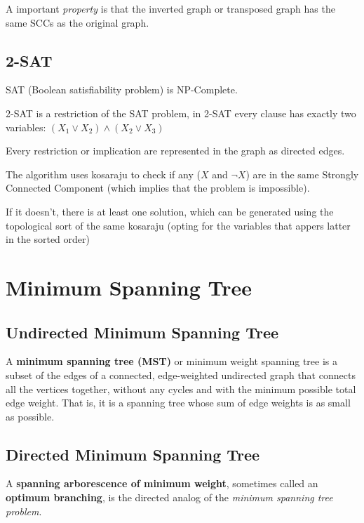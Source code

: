 	A important \textit{property} is that the inverted graph or transposed graph has the same SCCs
	as the original graph.


	\subsection{2-SAT}
	
		SAT (Boolean satisfiability problem) is NP-Complete.

		2-SAT is a restriction of the SAT problem, in 2-SAT every clause has exactly two variables:
		$ (X_1 \vee X_2) \wedge (X_2 \vee X_3) $

		Every restriction or implication are represented in the graph as directed edges.

		The algorithm uses kosaraju to check if any ($X$ and $\neg{X}$) are in the same Strongly Connected Component 
		(which implies that the problem is impossible). 

		If it doesn't, there is at least one solution, which can be generated using the topological sort of the same kosaraju 
		(opting for the variables that appers latter in the sorted order)


\section{Minimum Spanning Tree}

\subsection{Undirected Minimum Spanning Tree}

	A \textbf{minimum spanning tree (MST)} or minimum weight spanning tree is a subset of the edges
	of a connected, edge-weighted undirected graph that connects all the vertices together,
	without any cycles and with the minimum possible total edge weight.
	That is, it is a spanning tree whose sum of edge weights is as small as possible.


\subsection{Directed Minimum Spanning Tree}

	A \textbf{spanning arborescence of minimum weight}, sometimes called an \textbf{optimum branching},
	is the directed analog of the \textit{minimum spanning tree problem}.

